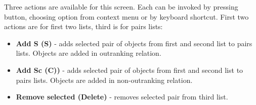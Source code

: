 Three actions are available for this screen. Each can be invoked by pressing button, choosing option from context menu or by keyboard shortcut. First two actions are for first two lists, third is for pairs lists:
\begin{itemize}
	\item \textbf{Add S (S)} - adds selected pair of objects from first and second list to pairs lists. Objects are added in outranking relation.
	\item \textbf{Add Sc (C))} - adds selected pair of objects from first and second list to pairs lists. Objects are added in non-outranking relation.
	\item \textbf{Remove selected (Delete)} - removes selected pair from third list.
\end{itemize}



\vfill\newpage